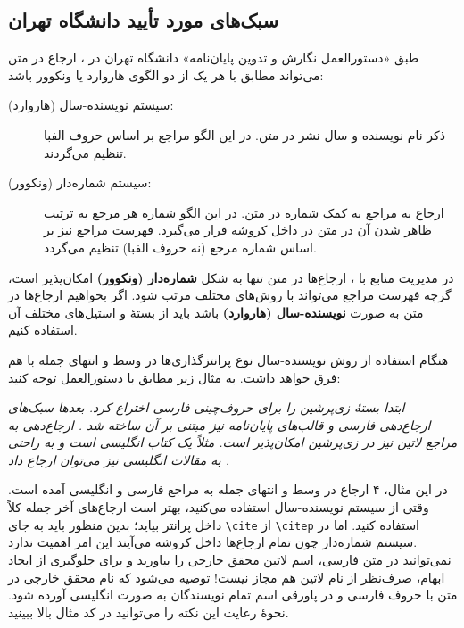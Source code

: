 \subsection{سبک‌های مورد تأیید دانشگاه تهران}
طبق «دستورالعمل نگارش و تدوین پایان‌نامه» دانشگاه تهران در
\cite{UTThesisGuide}،
ارجاع در متن می‌تواند مطابق با هر یک از دو الگوی هاروارد یا ونکوور باشد:
\singlespacing
\begin{description}
	\item[سیستم نویسنده-سال (هاروارد):]
	ذکر نام نویسنده و سال نشر در متن. در این الگو مراجع بر اساس حروف الفبا تنظیم می‌گردند.
	\item[سیستم شماره‌دار (ونکوور):]
	ارجاع به مراجع به کمک شماره در متن. در این الگو شماره هر مرجع به ترتیب ظاهر شدن آن در متن در داخل کروشه قرار می‌گیرد. فهرست مراجع نیز بر اساس شماره مرجع (نه حروف الفبا) تنظیم می‌گردد.
\end{description}
\doublespacing

در مدیریت منابع با
،
ارجاع‌ها در متن تنها به شکل
\textbf{شماره‌دار (ونکوور)}
امکان‌پذیر است، گرچه فهرست مراجع می‌تواند با روش‌های مختلف مرتب شود. اگر بخواهیم ارجاع‌ها در متن به صورت
\textbf{نویسنده-سال (هاروارد)}
باشد باید از بستهٔ
و استیل‌های مختلف آن استفاده کنیم.

هنگام استفاده از روش نویسنده-سال نوع پرانتزگذاری‌ها در وسط و انتهای جمله با هم فرق خواهد داشت. به مثال زیر مطابق با دستورالعمل
\cite{UTThesisGuide}
توجه کنید:

\textit{
ابتدا
\cite{Khalighi87xepersian}
بستهٔ زی‌پرشین را برای حروف‌چینی فارسی اختراع کرد. بعدها سبک‌های ارجاع‌دهی فارسی و قالب‌های پایان‌نامه نیز مبتنی بر آن ساخته شد
\citep{persianbib87userguide}.
ارجاع‌دهی به مراجع لاتین نیز در زی‌پرشین امکان‌پذیر است. مثلاً
یک کتاب انگلیسی است و به راحتی به مقالات انگلیسی نیز می‌توان ارجاع داد
.}

در این مثال، ۴ ارجاع در وسط و انتهای جمله به مراجع فارسی و انگلیسی آمده است. وقتی از سیستم نویسنده-سال استفاده می‌کنید، بهتر است ارجاع‌های آخر جمله کلاً داخل پرانتر بیاید؛ بدین منظور باید به جای
\verb|\cite|
از
\verb|\citep|
استفاده کنید. اما در سیستم شماره‌دار چون تمام ارجاع‌ها داخل کروشه می‌آیند این امر اهمیت ندارد.\\
نمی‌توانید در متن فارسی، اسم لاتین محقق خارجی را بیاورید و برای جلوگیری از ایجاد ابهام، صرف‌نظر از نام لاتین هم مجاز نیست! توصیه می‌شود که نام محقق خارجی در متن با حروف فارسی و در پاورقی اسم تمام نویسندگان به صورت انگلیسی آورده شود. نحوهٔ رعایت این نکته را می‌توانید در کد مثال بالا ببینید.

